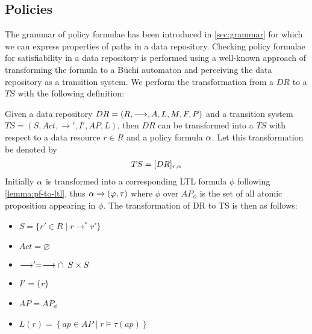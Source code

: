 \subsection{Policies}\label{sec:policies}
The grammar of policy formulae has been introduced in \autoref{sec:grammar} for which we can express properties of paths in a data repository. Checking policy formulae for satisfiability in a data repository is performed using a well-known approach of transforming the formula to a Büchi automaton and perceiving the data repository as a transition system. We perform the transformation from a $DR$ to a $TS$ with the following definition:
\begin{definition}\label{lemma:dr-to-ts}
Given a data repository $DR= \left( R, \longrightarrow, A, L, M, F, P \right)$ and a transition system $TS=\left(S, Act, \longrightarrow', I', AP, L \right)$, then $DR$ can be transformed into a $TS$ with respect to a data resource $r \in R$ and a policy formula $\alpha$. Let this transformation be denoted by
\begin{align*}
    TS = [DR]_{r,\alpha}    
\end{align*}
Initially $\alpha$ is transformed into a corresponding LTL formula $\phi$ following \autoref{lemma:pf-to-ltl}, thus $\alpha \xrightarrow{} \left(\varphi, \tau\right)$ where $\phi$ over $AP_\phi$ is the set of all atomic proposition appearing in $\phi$. The transformation of DR to TS is then as follows:
\begin{itemize}
  \item $S = \{ r' \in R \mid r \longrightarrow^\ast r' \}$
  \item $Act = \varnothing$
  \item $\longrightarrow' = \longrightarrow \cap \enskip S \times S$
  \item $I' = \{r\}$
  \item $AP = AP_\phi$
  \item $L(r) = \left\{ ap \in AP \mid r \models \tau(ap) \right\}$
\end{itemize}
\end{definition}


